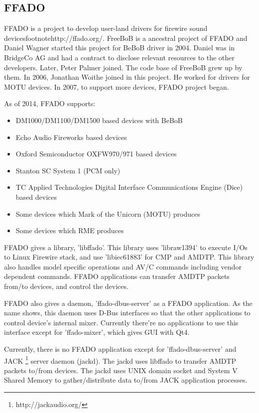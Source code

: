 \documentclass[onecolumn]{article}
\begin{document}
\subsection{FFADO}
FFADO is a project to develop user-land drivers for firewire sound devicesfootnote{http://ffado.org/}. FreeBoB is a ancestral project of FFADO and Daniel Wagner started this project for BeBoB driver in 2004. Daniel was in BridgeCo AG and had a contract to disclose relevant resources to the other developers. Later, Peter Palmer joined. The code base of FreeBoB grew up by them. In 2006, Jonathan Woithe joined in this project. He worked for drivers for MOTU devices. In 2007, to support more devices, FFADO project began.

As of 2014, FFADO supports:
\begin{itemize}
\item DM1000/DM1100/DM1500 based devices with BeBoB
\item Echo Audio Fireworks based devices
\item Oxford Semiconductor OXFW970/971 based devices
\item Stanton SC System 1 (PCM only)
\item TC Applied Technologies Digital Interface Communications Engine (Dice) based devices 
\item Some devices which Mark of the Unicorn (MOTU) produces
\item Some devices which RME produces
\end{itemize}

FFADO gives a library, 'libffado'. This library uses 'libraw1394' to execute I/Os to Linux Firewire stack, and use 'libiec61883' for CMP and AMDTP. This library also handles model specific operations and AV/C commands including vendor dependent commands. FFADO applications can transfer AMDTP packets from/to devices, and control the devices.

FFADO also gives a daemon, 'ffado-dbus-server' as a FFADO application. As the name shows, this daemon uses D-Bus interfaces so that the other applications to control device's internal mixer. Currently there're no applications to use this interface except for 'ffado-mixer', which gives GUI with Qt4.

Currently, there is no FFADO application except for 'ffado-dbus-server' and JACK \footnote{http://jackaudio.org/} server daemon (jackd). The jackd uses libffado to transfer AMDTP packets to/from devices. The jackd uses UNIX domain socket and System V Shared Memory to gather/distribute data to/from JACK application processes. 
\end{document}
